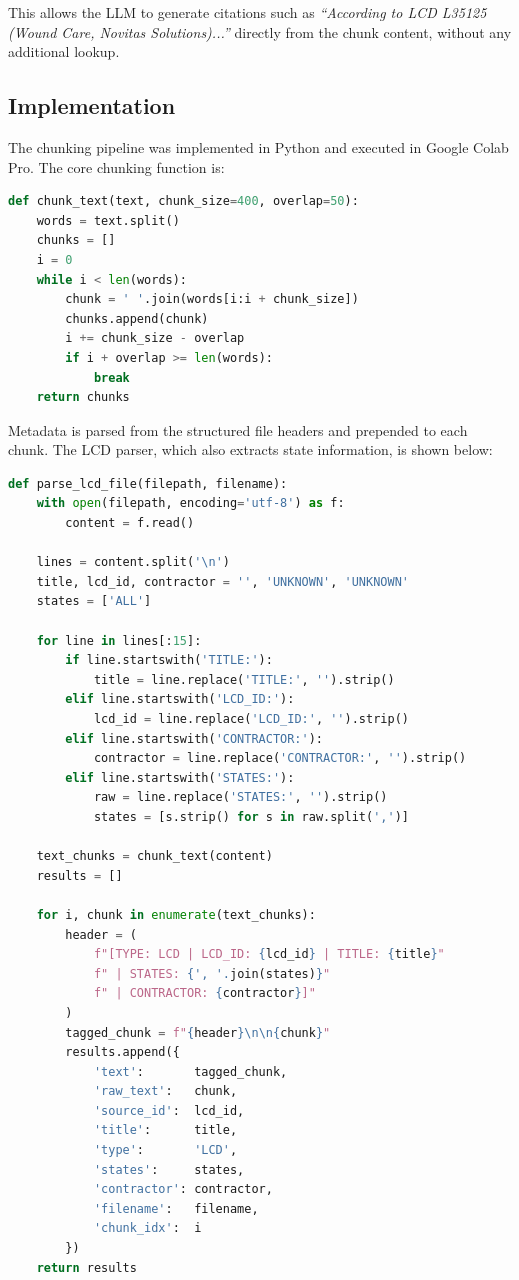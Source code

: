 \documentclass[10pt, letterpaper]{article}
\begin{document}
This allows the LLM to generate citations such as \textit{``According to LCD L35125
(Wound Care, Novitas Solutions)...''} directly from the chunk content, without any
additional lookup.
 
\subsection{Implementation}
 
The chunking pipeline was implemented in Python and executed in Google Colab Pro.
The core chunking function is:
 
\begin{lstlisting}[language=Python, caption=Core sliding-window chunking function]
def chunk_text(text, chunk_size=400, overlap=50):
    words = text.split()
    chunks = []
    i = 0
    while i < len(words):
        chunk = ' '.join(words[i:i + chunk_size])
        chunks.append(chunk)
        i += chunk_size - overlap
        if i + overlap >= len(words):
            break
    return chunks
\end{lstlisting}
 
Metadata is parsed from the structured file headers and prepended to each chunk.
The LCD parser, which also extracts state information, is shown below:
 
\begin{lstlisting}[language=Python, caption=LCD file parser with state metadata extraction]
def parse_lcd_file(filepath, filename):
    with open(filepath, encoding='utf-8') as f:
        content = f.read()
 
    lines = content.split('\n')
    title, lcd_id, contractor = '', 'UNKNOWN', 'UNKNOWN'
    states = ['ALL']
 
    for line in lines[:15]:
        if line.startswith('TITLE:'):
            title = line.replace('TITLE:', '').strip()
        elif line.startswith('LCD_ID:'):
            lcd_id = line.replace('LCD_ID:', '').strip()
        elif line.startswith('CONTRACTOR:'):
            contractor = line.replace('CONTRACTOR:', '').strip()
        elif line.startswith('STATES:'):
            raw = line.replace('STATES:', '').strip()
            states = [s.strip() for s in raw.split(',')]
 
    text_chunks = chunk_text(content)
    results = []
 
    for i, chunk in enumerate(text_chunks):
        header = (
            f"[TYPE: LCD | LCD_ID: {lcd_id} | TITLE: {title}"
            f" | STATES: {', '.join(states)}"
            f" | CONTRACTOR: {contractor}]"
        )
        tagged_chunk = f"{header}\n\n{chunk}"
        results.append({
            'text':       tagged_chunk,
            'raw_text':   chunk,
            'source_id':  lcd_id,
            'title':      title,
            'type':       'LCD',
            'states':     states,
            'contractor': contractor,
            'filename':   filename,
            'chunk_idx':  i
        })
    return results
\end{lstlisting}
 
\end{document}
